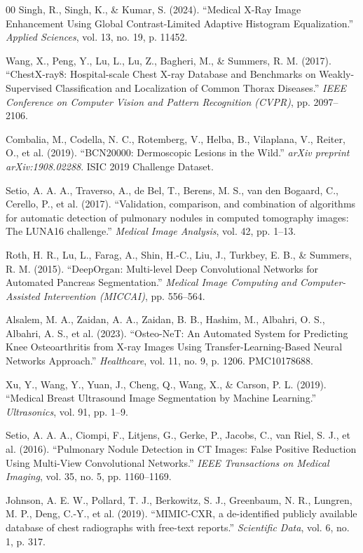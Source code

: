 \documentclass[conference]{IEEEtran}
\begin{document}
\begin{thebibliography}{00}
 Singh, R., Singh, K., \& Kumar, S. (2024). ``Medical X-Ray Image Enhancement Using Global Contrast-Limited Adaptive Histogram Equalization.'' \textit{Applied Sciences}, vol. 13, no. 19, p. 11452.

 Wang, X., Peng, Y., Lu, L., Lu, Z., Bagheri, M., \& Summers, R. M. (2017). ``ChestX-ray8: Hospital-scale Chest X-ray Database and Benchmarks on Weakly-Supervised Classification and Localization of Common Thorax Diseases.'' \textit{IEEE Conference on Computer Vision and Pattern Recognition (CVPR)}, pp. 2097--2106.

 Combalia, M., Codella, N. C., Rotemberg, V., Helba, B., Vilaplana, V., Reiter, O., et al. (2019). ``BCN20000: Dermoscopic Lesions in the Wild.'' \textit{arXiv preprint arXiv:1908.02288}. ISIC 2019 Challenge Dataset.

 Setio, A. A. A., Traverso, A., de Bel, T., Berens, M. S., van den Bogaard, C., Cerello, P., et al. (2017). ``Validation, comparison, and combination of algorithms for automatic detection of pulmonary nodules in computed tomography images: The LUNA16 challenge.'' \textit{Medical Image Analysis}, vol. 42, pp. 1--13.

 Roth, H. R., Lu, L., Farag, A., Shin, H.-C., Liu, J., Turkbey, E. B., \& Summers, R. M. (2015). ``DeepOrgan: Multi-level Deep Convolutional Networks for Automated Pancreas Segmentation.'' \textit{Medical Image Computing and Computer-Assisted Intervention (MICCAI)}, pp. 556--564.

 Alsalem, M. A., Zaidan, A. A., Zaidan, B. B., Hashim, M., Albahri, O. S., Albahri, A. S., et al. (2023). ``Osteo-NeT: An Automated System for Predicting Knee Osteoarthritis from X-ray Images Using Transfer-Learning-Based Neural Networks Approach.'' \textit{Healthcare}, vol. 11, no. 9, p. 1206. PMC10178688.

 Xu, Y., Wang, Y., Yuan, J., Cheng, Q., Wang, X., \& Carson, P. L. (2019). ``Medical Breast Ultrasound Image Segmentation by Machine Learning.'' \textit{Ultrasonics}, vol. 91, pp. 1--9.

 Setio, A. A. A., Ciompi, F., Litjens, G., Gerke, P., Jacobs, C., van Riel, S. J., et al. (2016). ``Pulmonary Nodule Detection in CT Images: False Positive Reduction Using Multi-View Convolutional Networks.'' \textit{IEEE Transactions on Medical Imaging}, vol. 35, no. 5, pp. 1160--1169.

 Johnson, A. E. W., Pollard, T. J., Berkowitz, S. J., Greenbaum, N. R., Lungren, M. P., Deng, C.-Y., et al. (2019). ``MIMIC-CXR, a de-identified publicly available database of chest radiographs with free-text reports.'' \textit{Scientific Data}, vol. 6, no. 1, p. 317.

\end{thebibliography}
\end{document}

